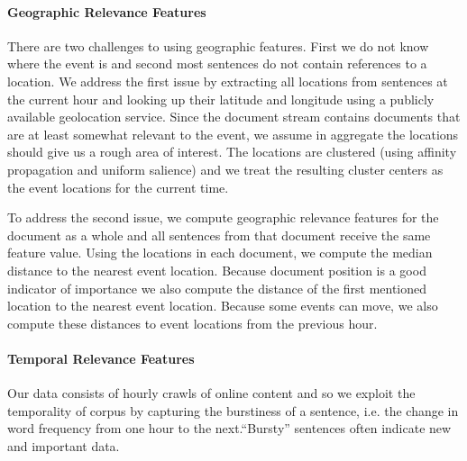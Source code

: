 
\paragraph{Geographic Relevance Features}
There are two challenges to using geographic features. First we do not 
know where the event is and second most sentences do not contain references
to a location.
We address the first issue by extracting all locations from sentences at the
current hour and looking up their latitude and 
longitude using a publicly available geolocation service. 
Since the document
stream contains documents that are at least somewhat relevant to the event,
we assume in aggregate the locations should give us a rough area of interest.
The locations are clustered (using affinity propagation and uniform salience)
and we treat the resulting cluster centers
as the event locations for the current time.

To address the second issue, 
we compute geographic relevance features for the document as a whole and all
sentences from that document receive the same feature value.
Using the locations in each document, we compute the median distance to the 
nearest event location. Because document position is a good indicator 
of importance we also compute the distance of the first mentioned
location to the nearest event location. Because some events can move, we also
compute these distances to event locations from the previous hour.



\paragraph{Temporal Relevance Features}
Our data consists of hourly crawls of online content and so we exploit the temporality of corpus by capturing the burstiness of a sentence, i.e.  the change in word frequency from one hour to the next.``Bursty'' sentences often indicate new and important data. 

